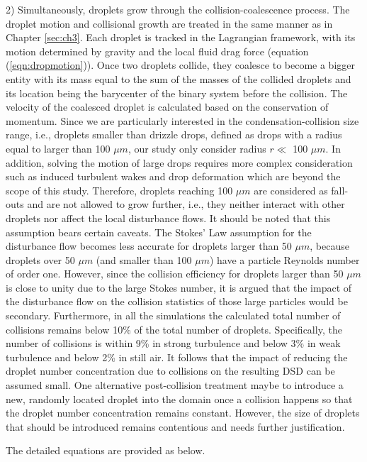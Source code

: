 2) Simultaneously, droplets grow through the collision-coalescence process. The droplet motion and collisional growth are treated in the same manner as in Chapter \ref{sec:ch3}. Each droplet is tracked in the Lagrangian framework, with its motion determined by gravity and the local fluid drag force (equation (\ref{eqn:dropmotion})). Once two droplets collide, they coalesce to become a bigger entity with its mass equal to the sum of the masses of the collided droplets and its location being the barycenter of the binary system before the collision. The velocity of the coalesced droplet is calculated based on the conservation of momentum. Since we are particularly interested in the condensation-collision size range, i.e., droplets smaller than drizzle drops, defined as drops with a radius equal to larger than 100 $\mu m$, our study only consider radius $r\ll$ 100 $\mu m$. In addition, solving the motion of large drops requires more complex consideration such as induced turbulent wakes and drop deformation which are beyond the scope of this study. Therefore, droplets reaching 100 $\mu m$ are considered as fall-outs and are not allowed to grow further, i.e., they neither interact with other droplets nor affect the local disturbance flows. It should be noted that this assumption bears certain caveats. The Stokes' Law assumption for the disturbance flow becomes less accurate for droplets larger than 50 $\mu m$, because droplets over 50 $\mu m$ (and smaller than 100 $\mu m$) have a particle Reynolds number of order one. However, since the collision efficiency for droplets larger than 50 $\mu m$ is close to unity due to the large Stokes number, it is argued that the impact of the disturbance flow on the collision statistics of those large particles would be secondary. Furthermore, in all the simulations the calculated total number of collisions remains below 10\% of the total number of droplets. Specifically, the number of collisions is within 9\% in strong turbulence and below 3\% in weak turbulence and below 2\% in still air. It follows that the impact of reducing the droplet number concentration due to collisions on the resulting DSD can be assumed small. One alternative post-collision treatment maybe to introduce a new, randomly located droplet into the domain once a collision happens so that the droplet number concentration remains constant. However, the size of droplets that should be introduced remains contentious and needs further justification.
 

The detailed equations are provided as below.

